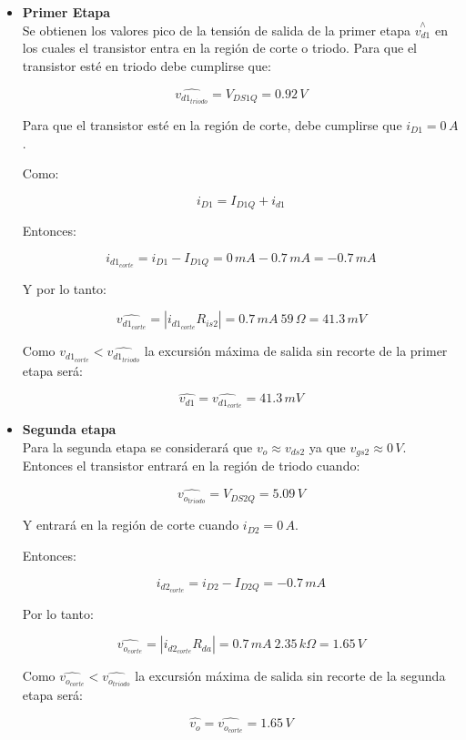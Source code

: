 \documentclass[10pt,spanish,a4paper,notitlepage]{article}
\begin{document}
\begin{itemize}
\item \textbf{Primer Etapa}\\

Se obtienen los valores pico de la tensión de salida de la primer etapa $\overset{\wedge}{v_{d1}}$
en los cuales el transistor entra en la región de corte o triodo. 
Para que el transistor esté en triodo debe cumplirse que:

\[ \displaystyle \widehat{v_{d1_{triodo}}} = V_{DS1Q} = 0.92\,\unit{V} \]


Para que el transistor esté en la región de corte, debe cumplirse que $i_{D1} = 0\,\unit{A}$.

Como:

\[ \displaystyle  i_{D1} = I_{D1Q} + i_{d1} \]

Entonces:

\[ \displaystyle i_{d1_{corte}} = i_{D1} - I_{D1Q} = 0\,\unit{mA} - 0.7\,\unit{mA} = -0.7\,\unit{mA} \]

Y por lo tanto:

\[ \displaystyle \widehat{v_{d1_{corte}}} = |i_{d1_{corte}} R_{is2}| = 0.7\,\unit{mA}\ 59\,\unit{\Omega} = 41.3\,\unit{mV} \]

Como $\widehat{v_{d1_{corte}}} < \widehat{v_{d1_{triodo}}}$ la excursión
máxima de salida sin recorte de la primer etapa será:

\begin{equation}
\widehat{v_{d1}} = \widehat{v_{d1_{corte}}} = 41.3\,\unit{mV}
\label{eq:vd1_max}
\end{equation}

\item \textbf{Segunda etapa}\\

Para la segunda etapa se considerará que $v_o \approx v_{ds2}$ ya que
$v_{gs2} \approx 0\,\unit{V}$.
Entonces el transistor entrará en la región de triodo cuando:

\[ \displaystyle \widehat{v_{o_{triodo}}} = V_{DS2Q} = 5.09\,\unit{V} \]

Y entrará en la región de corte cuando $i_{D2} = 0\,\unit{A}$.

Entonces:

\[ \displaystyle i_{d2_{corte}} = i_{D2} - I_{D2Q} = -0.7\,\unit{mA} \]

Por lo tanto:

\[ \displaystyle \widehat{v_{o_{corte}}} = |i_{d2_{corte}} R_{da}| = 0.7\,\unit{mA}\ 2.35\,\unit{k\Omega} = 1.65\,\unit{V} \]

Como $\widehat{v_{o_{corte}}} < \widehat{v_{o_{triodo}}}$ la excursión
máxima de salida sin recorte de la segunda etapa será:

\begin{equation}
\widehat{v_{o}} = \widehat{v_{o_{corte}}} = 1.65\,\unit{V}
\label{eq:vo_max}
\end{equation}

\end{itemize}
\end{document}
